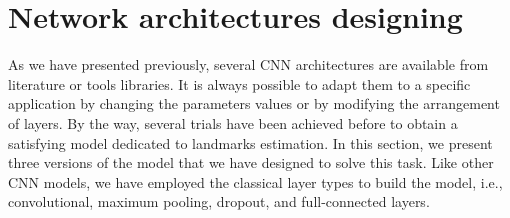 \documentclass[review]{elsarticle}
\begin{document}
\section{Network architectures designing}
\label{Sneuralnetwork}

As we have presented previously, several CNN architectures are available from literature or tools libraries. It is always possible to adapt them to a specific application by changing the parameters values or by modifying the arrangement of layers. By the way, several trials have been achieved before to obtain a satisfying model dedicated to landmarks estimation. In this section, we present three versions of the model that we have designed to solve this task. Like other CNN models, we have employed the classical layer types to build the model, i.e., convolutional, maximum pooling, dropout, and full-connected layers.
\end{document}
